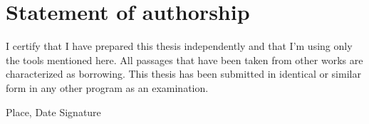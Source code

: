 \documentclass[twoside,12pt,a4paper, parskip=full-]{report}
\begin{document}

\cleardoublepage







\cleardoublepage


\printindex

\cleardoublepage

\thispagestyle{empty}
\section*{Statement of authorship}

I certify that I have prepared this thesis independently and that I'm using only the tools mentioned here. All passages that have been taken from other works are characterized as borrowing. This thesis has been submitted in identical or similar form in any other program as an examination.

\vskip 3cm

Place, Date	\hfill Signature \hfill 
\end{document}
